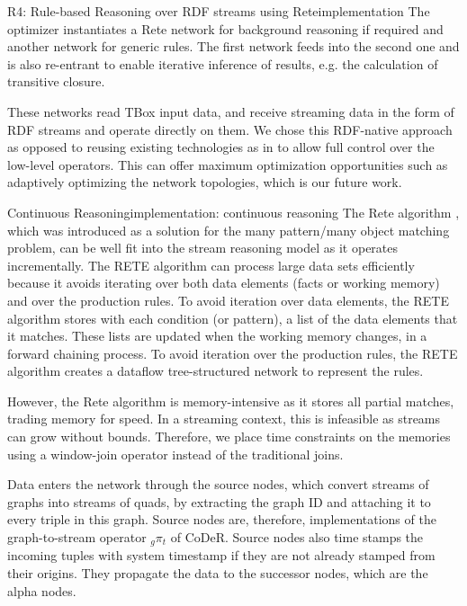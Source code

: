 \begin{nestedsection}{R4: Rule-based Reasoning over RDF streams using Rete}{implementation}
	The optimizer instantiates a Rete network for background reasoning if required and another network for generic rules.
	The first network feeds into the second one and is also re-entrant to enable iterative inference of results, e.g. the calculation of transitive closure.
	
	These networks read TBox input data, and receive streaming data in the form of RDF streams and operate directly on them.
	We chose this RDF-native approach as opposed to reusing existing technologies as in \citep{C-SPARQL,streaming-sparql} to allow full control over the low-level operators.
	This can offer maximum optimization opportunities such as adaptively optimizing the network topologies, which is our future work.

	\begin{nestedsection}{Continuous Reasoning}{implementation: continuous reasoning}
		The Rete algorithm \citep{forgy79}, which was introduced as a solution for the many pattern/many object matching problem, can be well fit into the stream reasoning model as it operates incrementally.
		The RETE algorithm can process large data sets efficiently because it avoids iterating over both data elements (facts or working memory) and over the production rules.
		To avoid iteration over data elements, the RETE algorithm stores with each condition (or pattern), a list of the data elements that it matches.
		These lists are updated when the working memory changes, in a forward chaining process.
		To avoid iteration over the production rules, the RETE algorithm creates a dataflow tree-structured network to represent the rules.

		However, the Rete algorithm is memory-intensive as it stores all partial matches, trading memory for speed.
		In a streaming context, this is infeasible as streams can grow without bounds.
		Therefore, we place time constraints on the memories using a window-join operator instead of the traditional joins.

		Data enters the network through the source nodes, which convert streams of graphs into streams of quads, by extracting the graph ID and attaching it to every triple in this graph.
		Source nodes are, therefore, implementations of the graph-to-stream operator ${{}_g{\pi_t}}$ of CoDeR.
		Source nodes also time stamps the incoming tuples with system timestamp if they are not already stamped from their origins.
		They propagate the data to the successor nodes, which are the alpha nodes.


\end{nestedsection}
\end{nestedsection}
